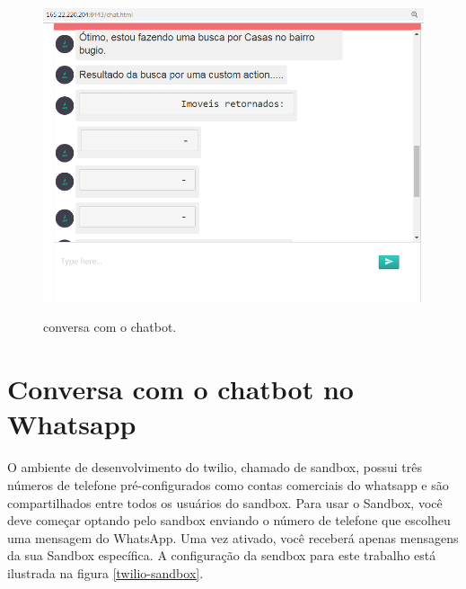 \begin{figure}[H]
  \centering
   \caption{conversa com o chatbot.}
  \includegraphics[scale=0.5]{Imagens/chat3.PNG} 
  \label{twilio-webhook-code}
\end{figure}



\section{Conversa com o chatbot no Whatsapp}

O ambiente de desenvolvimento do twilio, chamado de sandbox, possui três números de telefone pré-configurados como contas comerciais do whatsapp e são compartilhados entre todos os usuários do sandbox. Para usar o Sandbox, você deve começar optando pelo sandbox enviando o número de telefone que escolheu uma mensagem do WhatsApp. Uma vez ativado, você receberá apenas mensagens da sua Sandbox específica. A configuração da sendbox para este trabalho está ilustrada na figura \ref{twilio-sandbox}.


